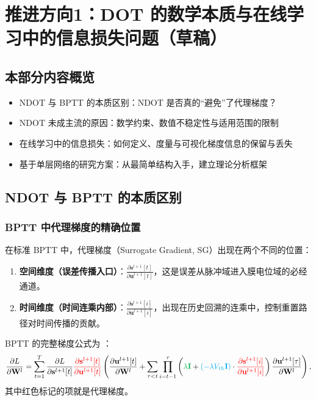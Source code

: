 \documentclass[journal,12pt,onecolumn]{IEEEtran}
\begin{document}
\section{推进方向1：DOT 的数学本质与在线学习中的信息损失问题（草稿）}

\subsection{本部分内容概览}
\begin{itemize}
    \item NDOT 与 BPTT 的本质区别：NDOT 是否真的“避免”了代理梯度？
    \item NDOT 未成主流的原因：数学约束、数值不稳定性与适用范围的限制
    \item 在线学习中的信息损失：如何定义、度量与可视化梯度信息的保留与丢失
    \item 基于单层网络的研究方案：从最简单结构入手，建立理论分析框架
\end{itemize}

\subsection{NDOT 与 BPTT 的本质区别}

\subsubsection{BPTT 中代理梯度的精确位置}

在标准 BPTT 中，代理梯度（Surrogate Gradient, SG）出现在两个不同的位置：

\begin{enumerate}
    \item \textbf{空间维度（误差传播入口）}：\(\frac{\partial \mathbf{s}^{l+1}[t]}{\partial \mathbf{u}^{l+1}[t]}\)，这是误差从脉冲域进入膜电位域的必经通道。
    \item \textbf{时间维度（时间连乘内部）}：\(\frac{\partial \mathbf{s}^{l+1}[i]}{\partial \mathbf{u}^{l+1}[i]}\)，出现在历史回溯的连乘中，控制重置路径对时间传播的贡献。
\end{enumerate}

BPTT 的完整梯度公式为 \cite{xiao_online_2022}：
\[
\frac{\partial L}{\partial \mathbf{W}^l}
=
\sum_{t=1}^T
\frac{\partial L}{\partial \mathbf{s}^{l+1}[t]}
{\color{red}{\frac{\partial \mathbf{s}^{l+1}[t]}{\partial \mathbf{u}^{l+1}[t]}}}
\left(
\frac{\partial \mathbf{u}^{l+1}[t]}{\partial \mathbf{W}^l}
+
\sum_{\tau < t}
\prod_{i=t-1}^{\tau}
\left(
{\color[rgb]{0,0.69,0.31}{\lambda \mathbf{I}}}
+
{\color{cyan}{(-\lambda V_{th}\mathbf{I})}}
\cdot
{\color{red}{\frac{\partial \mathbf{s}^{l+1}[i]}{\partial \mathbf{u}^{l+1}[i]}}}
\right)
\frac{\partial \mathbf{u}^{l+1}[\tau]}{\partial \mathbf{W}^l}
\right),
\]
其中红色标记的项就是代理梯度。
\end{document}
